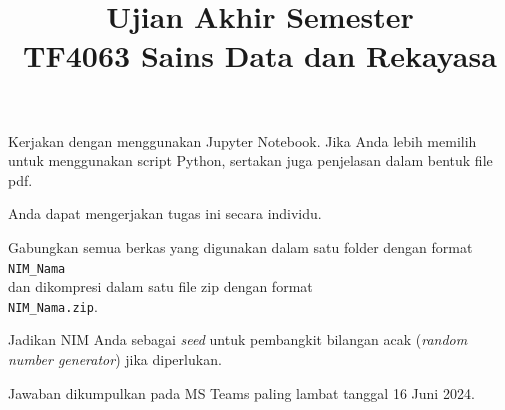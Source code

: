 \documentclass[a4paper,11pt]{article} %
\begin{document}
\title{Ujian Akhir Semester \\
TF4063 Sains Data dan Rekayasa}
\author{}
\date{}
\maketitle


Kerjakan dengan menggunakan Jupyter Notebook.
Jika Anda lebih memilih untuk menggunakan
script Python, sertakan juga penjelasan dalam bentuk file pdf.

Anda dapat mengerjakan tugas ini secara individu.

Gabungkan semua berkas yang digunakan dalam satu folder dengan format\\
\texttt{NIM\_Nama}\\
dan dikompresi dalam satu file zip dengan format\\
\texttt{NIM\_Nama.zip}.

Jadikan NIM Anda sebagai \textit{seed} untuk pembangkit bilangan acak
(\textit{random number generator}) jika diperlukan.

Jawaban dikumpulkan pada MS Teams paling lambat tanggal 16 Juni 2024.
\end{document}
